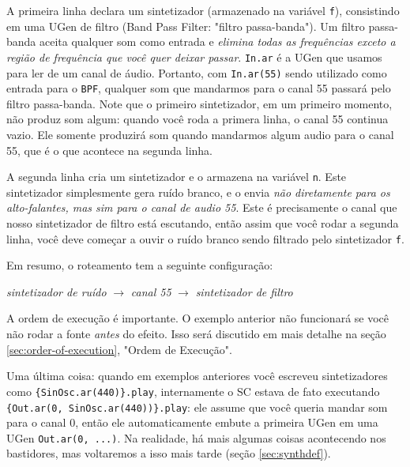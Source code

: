 A primeira linha declara um sintetizador (armazenado na variável \texttt{f}), consistindo em uma UGen de filtro (Band Pass Filter: "filtro passa-banda"). Um filtro passa-banda aceita qualquer som como entrada e \emph{elimina todas as frequências exceto a região de frequência que você quer deixar passar}. \texttt{In.ar} é a UGen que usamos para ler de um canal de áudio. Portanto, com \texttt{In.ar(55)} sendo utilizado como entrada para o \texttt{BPF}, qualquer som que mandarmos para o canal 55 passará pelo filtro passa-banda. Note que o primeiro sintetizador, em um primeiro momento, não produz som algum: quando você roda a primera linha, o canal 55 continua vazio. Ele somente produzirá som quando mandarmos algum audio para o canal 55, que é o que acontece na segunda linha.

A segunda linha cria um sintetizador e o armazena na variável \texttt{n}. Este sintetizador simplesmente gera ruído branco, e o envia \emph{não diretamente para os alto-falantes, mas sim para o canal de audio 55}. Este é precisamente o canal que nosso sintetizador de filtro está escutando, então assim que você rodar a segunda linha, você deve começar a ouvir o ruído branco sendo filtrado pelo sintetizador \texttt{f}.

Em resumo, o roteamento tem a seguinte configuração: 

\begin{center}
\emph{sintetizador de ruído} $\rightarrow$ \emph{canal 55} $\rightarrow$ \emph{sintetizador de filtro}
\end{center}

A ordem de execução é importante. O exemplo anterior não funcionará se você não rodar a fonte \emph{antes} do efeito. Isso será discutido em mais detalhe na seção \ref{sec:order-of-execution}, "Ordem de Execução".

Uma última coisa: quando em exemplos anteriores você escreveu sintetizadores como \texttt{\{SinOsc.ar(440)\}.play}, internamente o SC estava de fato executando \texttt{\{Out.ar(0, SinOsc.ar(440))\}.play}: ele assume que você queria mandar som para o canal 0, então ele automaticamente embute a primeira UGen em uma UGen \texttt{Out.ar(0, ...)}. Na realidade, há mais algumas coisas acontecendo nos bastidores, mas voltaremos a isso mais tarde (seção \ref{sec:synthdef}).
